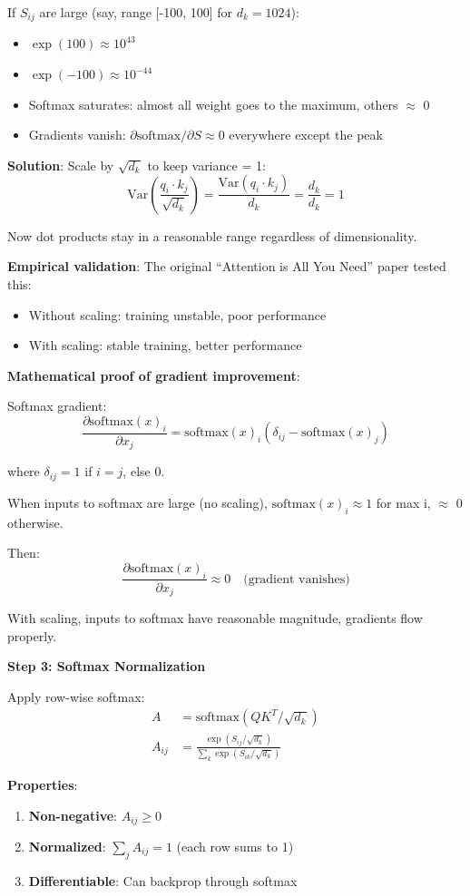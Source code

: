 If $S_{ij}$ are large (say, range [-100, 100] for $d_k=1024$):
\begin{itemize}
\item $\exp(100) \approx 10^{43}$
\item $\exp(-100) \approx 10^{-44}$
\item Softmax saturates: almost all weight goes to the maximum, others $\approx$ 0
\item Gradients vanish: $\partial \text{softmax}/\partial S \approx 0$ everywhere except the peak
\end{itemize}

\textbf{Solution}: Scale by $\sqrt{d_k}$ to keep variance = 1:
\[
\text{Var}\left(\frac{q_i \cdot k_j}{\sqrt{d_k}}\right) = \frac{\text{Var}(q_i \cdot k_j)}{d_k} = \frac{d_k}{d_k} = 1
\]

Now dot products stay in a reasonable range regardless of dimensionality.

\textbf{Empirical validation}: The original ``Attention is All You Need'' paper tested this:
\begin{itemize}
\item Without scaling: training unstable, poor performance
\item With scaling: stable training, better performance
\end{itemize}

\textbf{Mathematical proof of gradient improvement}:

Softmax gradient:
\[
\frac{\partial \text{softmax}(x)_i}{\partial x_j} = \text{softmax}(x)_i (\delta_{ij} - \text{softmax}(x)_j)
\]

where $\delta_{ij} = 1$ if $i=j$, else 0.

When inputs to softmax are large (no scaling), $\text{softmax}(x)_i \approx 1$ for max i, $\approx$ 0 otherwise.

Then:
\[
\frac{\partial \text{softmax}(x)_i}{\partial x_j} \approx 0  \quad \text{(gradient vanishes)}
\]

With scaling, inputs to softmax have reasonable magnitude, gradients flow properly.

\textbf{Step 3: Softmax Normalization}

Apply row-wise softmax:
\begin{align*}
A &= \text{softmax}(QK^T / \sqrt{d_k}) \\
A_{ij} &= \frac{\exp(S_{ij}/\sqrt{d_k})}{\sum_k \exp(S_{ik}/\sqrt{d_k})}
\end{align*}

\textbf{Properties}:
\begin{enumerate}
\item \textbf{Non-negative}: $A_{ij} \geq 0$
\item \textbf{Normalized}: $\sum_j A_{ij} = 1$ (each row sums to 1)
\item \textbf{Differentiable}: Can backprop through softmax
\end{enumerate}

